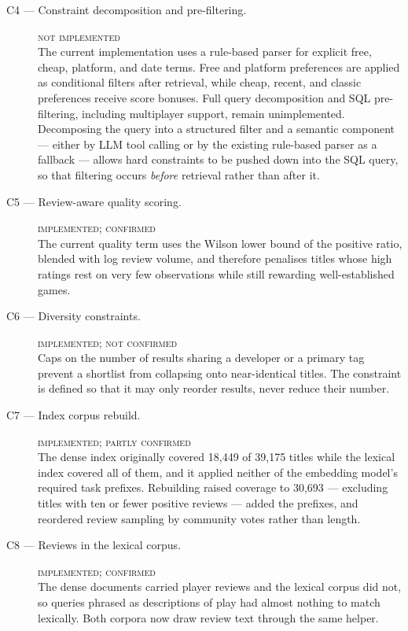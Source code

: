 \begin{description}
  \item[C4 --- Constraint decomposition and pre-filtering.] \hfill\textsc{not implemented}\\
  The current implementation uses a rule-based parser for explicit free, cheap,
  platform, and date terms. Free and platform preferences are applied as
  conditional filters after retrieval, while cheap, recent, and classic
  preferences receive score bonuses. Full query decomposition and SQL
  pre-filtering, including multiplayer support, remain unimplemented.
  Decomposing the query into a structured filter and a semantic component
  --- either by LLM tool calling or by the existing rule-based parser as a
  fallback --- allows hard constraints to be pushed down into the SQL query, so
  that filtering occurs \emph{before} retrieval rather than after it.

  \item[C5 --- Review-aware quality scoring.] \hfill\textsc{implemented; confirmed}\\
  The current quality term uses the Wilson lower bound of the positive ratio,
  blended with log review volume, and therefore penalises titles whose
  high ratings rest on very few observations while still rewarding
  well-established games.

  \item[C6 --- Diversity constraints.] \hfill\textsc{implemented; not confirmed}\\
  Caps on the number of results sharing a developer or a primary tag prevent a
  shortlist from collapsing onto near-identical titles. The constraint is
  defined so that it may only reorder results, never reduce their number.

  \item[C7 --- Index corpus rebuild.] \hfill\textsc{implemented; partly confirmed}\\
  The dense index originally covered 18,449 of 39,175 titles while the lexical
  index covered all of them, and it applied neither of the embedding model's
  required task prefixes. Rebuilding raised coverage to 30,693 --- excluding titles
  with ten or fewer positive reviews --- added the prefixes, and reordered review
  sampling by community votes rather than length.

  \item[C8 --- Reviews in the lexical corpus.] \hfill\textsc{implemented; confirmed}\\
  The dense documents carried player reviews and the lexical corpus did not,
  so queries phrased as descriptions of play had almost nothing to match
  lexically. Both corpora now draw review text through the same helper.

\end{description}

